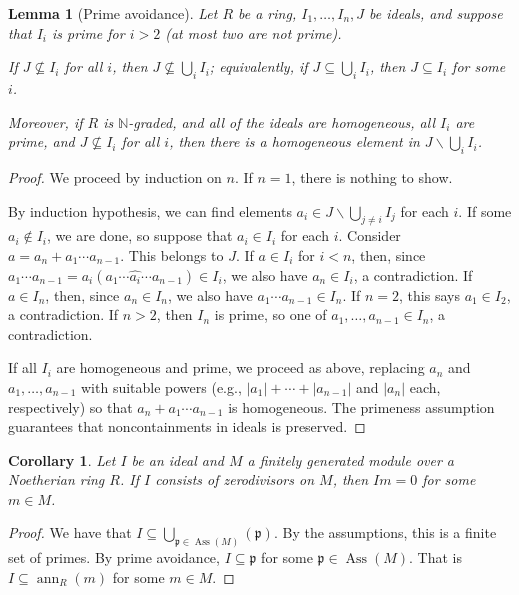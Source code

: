 \documentclass{amsart}[12pt]
\def\Ass{\operatorname{Ass}}
\def\ann{\operatorname{ann}}
\newcommand{\NN}{\mathbb{N}}
\newcommand{\p}{{\mathfrak p}}
\numberwithin{equation}{section}
\theoremstyle{plain} %
\newtheorem{corollary}[equation]{Corollary}
\newtheorem{lemma}[equation]{Lemma}
\theoremstyle{definition}
\theoremstyle{remark}
\begin{document}
\begin{lemma}[Prime avoidance] Let $R$ be a ring, $I_1,\dots,I_n,J$ be ideals, and suppose that $I_i$ is prime for $i>2$ (at most two are not prime). 
	
	If $J\not\subseteq I_i$ for all $i$, then $J\not\subseteq \bigcup_i I_i$; equivalently, if $J\subseteq \bigcup_i I_i$, then $J\subseteq I_i$ for some $i$.
	
	Moreover, if $R$ is $\NN$-graded, and all of the ideals are homogeneous, all $I_i$ are prime, and $J\not\subseteq I_i$ for all $i$, then there is a homogeneous element in $J \smallsetminus \bigcup_i I_i$.
\end{lemma}
\begin{proof} 
	We proceed by induction on $n$. If $n=1$, there is nothing to show.
	
	By induction hypothesis, we can find elements $a_i \in J \smallsetminus \bigcup_{j\neq i} I_j$ for each $i$. If some $a_i\notin I_i$, we are done, so suppose that $a_i\in I_i$ for each $i$. Consider $a= a_n + a_1 \cdots a_{n-1}$. This belongs to $J$. If $a\in I_i$ for $i<n$, then, since $a_1\cdots a_{n-1}=a_i(a_1\cdots \widehat{a_i} \cdots a_{n-1})\in I_i$, we also have $a_n\in I_i$, a contradiction. If $a\in I_n$, then, since $a_n\in I_n$, we also have $a_1\cdots a_{n-1}\in I_n$. If $n=2$, this says $a_1\in I_2$, a contradiction. If $n>2$, then $I_n$ is prime, so one of $a_1,\dots,a_{n-1}\in I_n$, a contradiction.
	
	If all $I_i$ are homogeneous and prime, we proceed as above, replacing $a_n$ and $a_1,\dots,a_{n-1}$ with suitable powers (e.g., $|a_1| + \cdots + |a_{n-1}|$ and $|a_n|$ each, respectively) so that $a_n + a_1 \cdots a_{n-1}$ is homogeneous. The primeness assumption guarantees that noncontainments in ideals is preserved.
\end{proof}

\begin{corollary}
	Let $I$ be an ideal and $M$ a finitely generated module over a Noetherian ring $R$. If $I$ consists of zerodivisors on $M$, then $Im=0$ for some $m\in M$.
\end{corollary}
\begin{proof}
	We have that $I\subseteq \bigcup_{\p \in \Ass(M)}(\p)$. By the assumptions, this is a finite set of primes. By prime avoidance, $I \subseteq \p$ for some $\p \in \Ass(M)$. That is $I\subseteq \ann_R(m)$ for some $m\in M$.
\end{proof}
\end{document}
